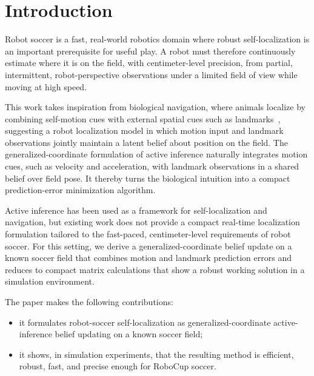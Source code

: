 \section{Introduction}
\label{sec:introduction}

Robot soccer is a fast, real-world robotics domain where robust self-localization is an important prerequisite for useful play. A robot must therefore continuously estimate where it is on the field, with centimeter-level precision, from partial, intermittent, robot-perspective observations under a limited field of view while moving at high speed.

This work takes inspiration from biological navigation, where animals localize by combining self-motion cues with external spatial cues such as landmarks~\cite{tang_learning_2024},
suggesting a robot localization model in which motion input and landmark observations jointly maintain a latent belief about position on the field.
The generalized-coordinate formulation of active inference naturally integrates motion cues, such as velocity and acceleration, with landmark observations
in a shared belief over field pose. It thereby turns the biological intuition into a compact prediction-error minimization algorithm.

Active inference has been used as a framework for self-localization and navigation, but existing work does not provide a compact real-time localization formulation tailored to the fast-paced, centimeter-level requirements of robot soccer. For this setting, we derive a generalized-coordinate belief update on a known soccer field that combines motion and landmark prediction errors and reduces to compact matrix calculations that show a robust working solution in a simulation environment.

The paper makes the following contributions:
\begin{itemize}
    \item it formulates robot-soccer self-localization as generalized-coordinate active-inference belief updating on a known soccer field;
    \item it shows, in simulation experiments, that the resulting method is efficient, robust, fast, and precise enough for RoboCup soccer.
\end{itemize}
